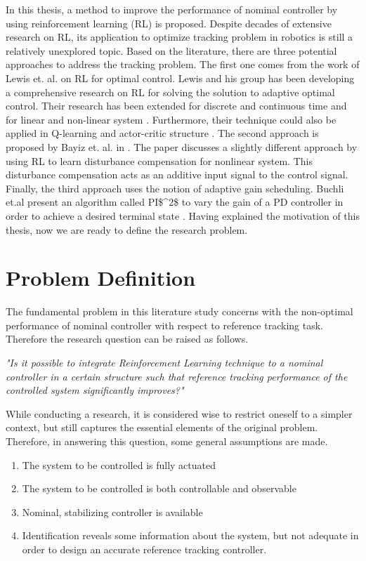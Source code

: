 In this thesis, a method to improve the performance of nominal controller by using reinforcement learning (\ac{RL}) is proposed. Despite decades of extensive research on \ac{RL}, its application to optimize tracking problem in robotics is still a relatively unexplored topic. Based on the literature, there are three potential approaches to address the tracking problem. The first one comes from the work of Lewis et. al. on \ac{RL} for optimal control. Lewis and his group has been developing a comprehensive research on \ac{RL} for solving the solution to adaptive optimal control. Their research has been extended for discrete and continuous time and for linear and non-linear system \cite{Kiumarsi6760476} \cite{Lewis5227780} \cite{Modares20141780} \cite{Modares6760477}. Furthermore, their technique could also be applied in Q-learning \cite{Kiumarsi20141167} and actor-critic structure \cite{Kiumarsi6918527}. The second approach is proposed by Bayiz et. al. in \cite{Efe2014}. The paper discusses a slightly different approach by using \ac{RL} to learn disturbance compensation for nonlinear system. This disturbance compensation acts as an additive input signal to the control signal. Finally, the third approach uses the notion of adaptive gain scheduling. Buchli et.al present an algorithm called \ac{PI$^2$} to vary the gain of a \ac{PD} controller in order to achieve a desired terminal state \cite{Buchli2010} \cite{Buchli6037312}. Having explained the motivation of this thesis, now we are ready to define the research problem.



\section{Problem Definition}
The fundamental problem in this literature study concerns with the non-optimal performance of nominal controller with respect to reference tracking task. Therefore the research question can be raised as follows.

\textit{"Is it possible to integrate Reinforcement Learning technique to a nominal controller in a certain structure such that reference tracking performance of the controlled system significantly improves?"}

While conducting a research, it is considered wise to restrict oneself to a simpler context, but still captures the essential elements of the original problem. Therefore, in answering this question, some general assumptions are made.

\begin{enumerate}
	\item The system to be controlled is fully actuated
	\item The system to be controlled is both controllable and observable
	\item Nominal, stabilizing controller is available	
	\item Identification reveals some information about the system, but not adequate in order to design an accurate reference tracking controller.
\end{enumerate}

